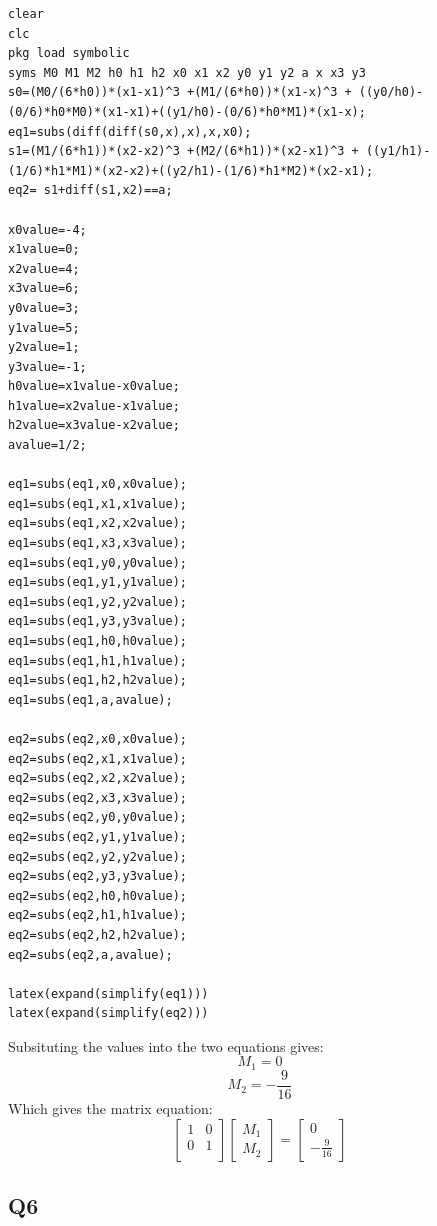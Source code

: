 \documentclass[11pt]{article}
\begin{document}
\begin{verbatim}
clear
clc
pkg load symbolic
syms M0 M1 M2 h0 h1 h2 x0 x1 x2 y0 y1 y2 a x x3 y3
s0=(M0/(6*h0))*(x1-x1)^3 +(M1/(6*h0))*(x1-x)^3 + ((y0/h0)-(0/6)*h0*M0)*(x1-x1)+((y1/h0)-(0/6)*h0*M1)*(x1-x);
eq1=subs(diff(diff(s0,x),x),x,x0);
s1=(M1/(6*h1))*(x2-x2)^3 +(M2/(6*h1))*(x2-x1)^3 + ((y1/h1)-(1/6)*h1*M1)*(x2-x2)+((y2/h1)-(1/6)*h1*M2)*(x2-x1);
eq2= s1+diff(s1,x2)==a;

x0value=-4;
x1value=0;
x2value=4;
x3value=6;
y0value=3;
y1value=5;
y2value=1;
y3value=-1;
h0value=x1value-x0value;
h1value=x2value-x1value;
h2value=x3value-x2value;
avalue=1/2;

eq1=subs(eq1,x0,x0value);
eq1=subs(eq1,x1,x1value);
eq1=subs(eq1,x2,x2value);
eq1=subs(eq1,x3,x3value);
eq1=subs(eq1,y0,y0value);
eq1=subs(eq1,y1,y1value);
eq1=subs(eq1,y2,y2value);
eq1=subs(eq1,y3,y3value);
eq1=subs(eq1,h0,h0value);
eq1=subs(eq1,h1,h1value);
eq1=subs(eq1,h2,h2value);
eq1=subs(eq1,a,avalue);

eq2=subs(eq2,x0,x0value);
eq2=subs(eq2,x1,x1value);
eq2=subs(eq2,x2,x2value);
eq2=subs(eq2,x3,x3value);
eq2=subs(eq2,y0,y0value);
eq2=subs(eq2,y1,y1value);
eq2=subs(eq2,y2,y2value);
eq2=subs(eq2,y3,y3value);
eq2=subs(eq2,h0,h0value);
eq2=subs(eq2,h1,h1value);
eq2=subs(eq2,h2,h2value);
eq2=subs(eq2,a,avalue);

latex(expand(simplify(eq1)))
latex(expand(simplify(eq2)))

\end{verbatim}
Subsituting the values into the two equations gives:
\[M_{1}=0\]
\[M_{2} = - \frac{9}{16}\]
Which gives the matrix equation:
\[\begin{bmatrix}
1 & 0 \\
0 & 1\\
\end{bmatrix} \begin{bmatrix}
M_1 \\
M_2
\end{bmatrix} = \begin{bmatrix}
0 \\
-\frac{9}{16}
\end{bmatrix}\]
\subsection{Q6}
\label{sec:org8065d2a}
\end{document}
